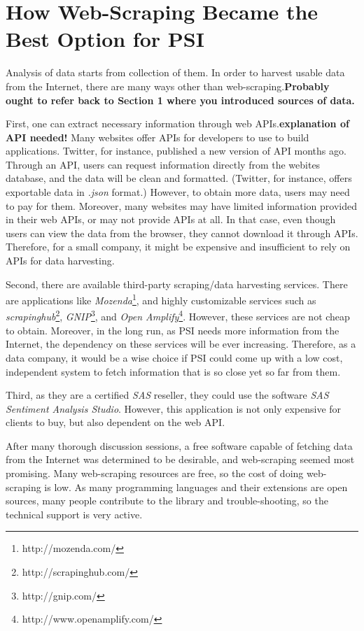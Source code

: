 \documentclass[12pt]{report}
\begin{document}
\section{How Web-Scraping Became the Best Option for PSI}

Analysis of data starts from collection of them. In order to harvest usable data from the Internet, there are many ways other than web-scraping.\textbf{Probably ought to refer back to Section 1 where you introduced sources of data.}

First, one can extract necessary information through web APIs.\textbf{explanation of API needed!} Many websites offer APIs for developers to use to build applications. Twitter, for instance, published a new version of API months ago. Through an API, users can request information directly from the webites database, and the data will be clean and formatted. (Twitter, for instance, offers exportable data in \textit{.json} format.) However, to obtain more data, users may need to pay for them. Moreover, many websites may have limited information provided in their web APIs, or may not provide APIs at all. In that case, even though users can view the data from the browser, they cannot download it through APIs. Therefore, for a small company, it might be expensive and insufficient to rely on APIs for data harvesting.

Second, there are available third-party scraping/data harvesting services. There are applications like \textit{Mozenda}\footnote{http://mozenda.com/}, and highly customizable services such as \textit{scrapinghub}\footnote{http://scrapinghub.com/}, \textit{GNIP}\footnote{http://gnip.com/}, and \textit{Open Amplify}\footnote{http://www.openamplify.com/}. However, these services are not cheap to obtain. Moreover, in the long run, as PSI needs more information from the Internet, the dependency on these services will be ever increasing. Therefore, as a data company, it would be a wise choice if PSI could come up with a low cost, independent system to fetch information that is so close yet so far from them. 

Third, as they are a certified \textit{SAS} reseller, they could use the software \textit{SAS Sentiment Analysis Studio}. However, this application is not only expensive for clients to buy, but also dependent on the web API. 

After many thorough discussion sessions, a free software capable of fetching data from the Internet was determined to be desirable, and web-scraping seemed most promising. Many web-scraping resources are free, so the cost of doing web-scraping is low. As many programming languages and their extensions are open sources, many people contribute to the library and trouble-shooting, so the technical support is very active.
\end{document}
